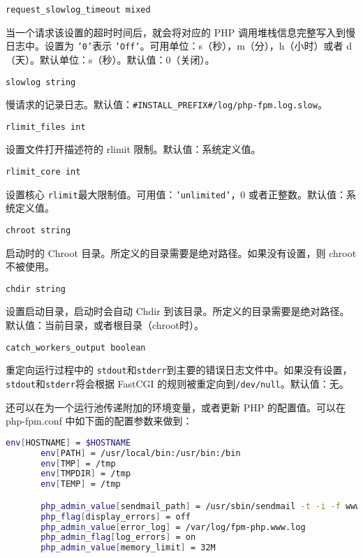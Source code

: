 \begin{compactenum}
\begin{compactitem}
\item \texttt{request\_slowlog\_timeout mixed}

当一个请求该设置的超时时间后，就会将对应的 PHP 调用堆栈信息完整写入到慢日志中。设置为 \texttt{'0'}表示 \texttt{'Off'}。可用单位：s（秒），m（分），h（小时）或者 d（天）。默认单位：s（秒）。默认值：0（关闭）。

\item \texttt{slowlog string}

慢请求的记录日志。默认值：\texttt{\#INSTALL\_PREFIX\#/log/php-fpm.log.slow}。

\item \texttt{rlimit\_files int}

设置文件打开描述符的 rlimit 限制。默认值：系统定义值。

\item \texttt{rlimit\_core int}

设置核心 \texttt{rlimit}最大限制值。可用值：\texttt{'unlimited'}，0 或者正整数。默认值：系统定义值。

\item \texttt{chroot string}

启动时的 Chroot 目录。所定义的目录需要是绝对路径。如果没有设置，则 chroot 不被使用。

\item \texttt{chdir string}

设置启动目录，启动时会自动 Chdir 到该目录。所定义的目录需要是绝对路径。默认值：当前目录，或者根目录（chroot时）。

\item \texttt{catch\_workers\_output boolean}

重定向运行过程中的 \texttt{stdout}和\texttt{stderr}到主要的错误日志文件中。如果没有设置，\texttt{stdout}和\texttt{stderr}将会根据 FastCGI 的规则被重定向到\texttt{/dev/null}。默认值：无。

\end{compactitem}

\end{compactenum}

还可以在为一个运行池传递附加的环境变量，或者更新 PHP 的配置值。可以在 php-fpm.conf 中如下面的配置参数来做到：

\begin{lstlisting}[language=bash]
env[HOSTNAME] = $HOSTNAME
       env[PATH] = /usr/local/bin:/usr/bin:/bin
       env[TMP] = /tmp
       env[TMPDIR] = /tmp
       env[TEMP] = /tmp

       php_admin_value[sendmail_path] = /usr/sbin/sendmail -t -i -f www@my.domain.com
       php_flag[display_errors] = off
       php_admin_value[error_log] = /var/log/fpm-php.www.log
       php_admin_flag[log_errors] = on
       php_admin_value[memory_limit] = 32M
\end{lstlisting}

